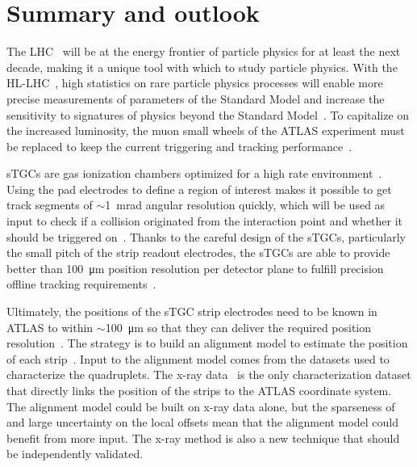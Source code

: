 
\chapter{Summary and outlook}
\label{chap:outlook_and_summary}

The LHC~\cite{evans_lhc_2008} will be at the energy frontier of particle physics for at least the next decade, making it a unique tool with which to study particle physics. With the HL-LHC~\cite{hl_lhc_tdr}, high statistics on rare particle physics processes will enable more precise measurements of parameters of the Standard Model and increase the sensitivity to signatures of physics beyond the Standard Model~\cite{dainese_physics_2018}. To capitalize on the increased luminosity, the muon small wheels of the ATLAS experiment must be replaced to keep the current triggering and tracking performance~\cite{nsw_tdr}. 

sTGCs are gas ionization chambers optimized for a high rate environment~\cite{nsw_tdr}. Using the pad electrodes to define a region of interest makes it possible to get track segments of $\sim$\SI{1}{mrad} angular resolution quickly, which will be used as input to check if a collision originated from the interaction point and whether it should be triggered on~\cite{nsw_tdr, perez-codina_small-strip_2016}. Thanks to the careful design of the sTGCs, particularly the small pitch of the strip readout electrodes, the sTGCs are able to provide better than \SI{100}{\micro\meter} position resolution per detector plane to fulfill precision offline tracking requirements~\cite{abusleme_performance_2016}. 

Ultimately, the positions of the sTGC strip electrodes need to be known in ATLAS to within $\sim$\SI{100}{\micro\meter} so that they can deliver the required position resolution~\cite{nsw_tdr}. The strategy is to build an alignment model to estimate the position of each strip~\cite{lefebvre_precision_2020}. Input to the alignment model comes from the datasets used to characterize the quadruplets. The x-ray data~\cite{lefebvre_precision_2020} is the only characterization dataset that directly links the position of the strips to the ATLAS coordinate system. The alignment model could be built on x-ray data alone, but the sparseness of and large uncertainty on the local offsets mean that the alignment model could benefit from more input. The x-ray method is also a new technique that should be independently validated.

